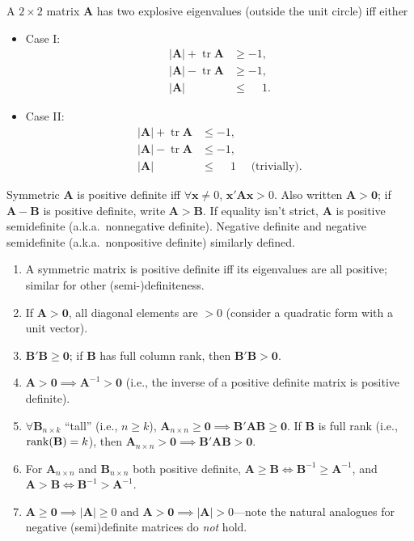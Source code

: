 \documentclass[8pt,letterpaper, landscape]{extarticle} %
\newcommand{\mA}{\ensuremath{\mathbf{A}}}
\newcommand{\mB}{\ensuremath{\mathbf{B}}}
\newcommand{\mx}{\ensuremath{\mathbf{x}}}
\newcommand{\mzero}{\ensuremath{\mathbf{0}}}
\begin{document}
\begin{multicols}{3}
\begin{description}
A $ 2 \times 2 $ matrix $ \mA $ has two explosive eigenvalues (outside the unit circle) iff either
\begin{itemize}
\item Case I:
\begin{align*}
| \mA | + \operatorname{tr} \mA &\geq -1 , \\
| \mA | - \operatorname{tr} \mA &\geq -1 , \\
| \mA | \phantom{{} + \operatorname{tr} \mA} &\leq \phantom{-} 1 .
\end{align*}
\item Case II:
\begin{align*}
| \mA | + \operatorname{tr} \mA &\leq -1 , \\
| \mA | - \operatorname{tr} \mA &\leq -1 , \\
| \mA | \phantom{{} + \operatorname{tr} \mA} &\leq \phantom{-} 1 \quad \text{ (trivially)}.
\end{align*}
\end{itemize}

 Symmetric $ \mA $ is positive definite iff $ \forall \mx \neq 0 $, $ \mx' \mA \mx > 0 $. Also written $ \mA > \mzero $; if $ \mA - \mB $ is positive definite, write $ \mA > \mB $. If equality isn't strict, $ \mA $ is positive semidefinite (a.k.a.\ nonnegative definite). Negative definite and negative semidefinite (a.k.a.\ nonpositive definite) similarly defined.
\begin{enumerate}
\item A symmetric matrix is positive definite iff its eigenvalues are all positive; similar for other (semi-)definiteness.
\item If $ \mA > \mzero $, all diagonal elements are $ >0 $ (consider a quadratic form with a unit vector).
\item $ \mB' \mB \geq \mzero $; if $ \mB $ has full column rank, then $ \mB' \mB > \mzero $.
\item $ \mA > \mzero \implies \mA^{-1} > \mzero $ (i.e., the inverse of a positive definite matrix is positive definite).
\item $ \forall \mB_{n \times k} $ ``tall'' (i.e., $ n \geq k $), $ \mA_{n \times n} \geq \mzero \implies \mB' \mA \mB \geq \mzero $. If $ \mB $ is full rank (i.e., $ \rank(\mB) = k $), then $ \mA_{n \times n} > \mzero \implies \mB' \mA \mB > \mzero $.
\item For $ \mA_{n \times n} $ and $ \mB_{n \times n} $ both positive definite, $ \mA \geq \mB \iff \mB^{-1} \geq \mA^{-1} $, and $ \mA > \mB \iff \mB^{-1} > \mA^{-1} $.
\item $ \mA \geq \mzero \implies \lvert \mA \rvert \geq 0 $ and $ \mA > \mzero \implies \lvert \mA \rvert > 0 $---note the natural analogues for negative (semi)definite matrices do \textit{not} hold. 
\end{enumerate}


\end{description}
\end{multicols}
\end{document}
